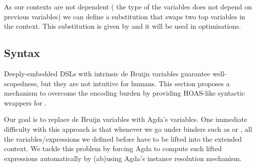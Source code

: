 As our contexts are not dependent (\eg{} the type of the variables does not
depend on previous variables) we can define a substitution that swaps two top
variables in the context.  This substitution is given by  and it
will be used in optimisations.
\begin{mathpar}
\end{mathpar}

\subsection{Syntax}
Deeply-embedded DSLs with intrinsic de Bruijn variables guarantee well-scopedness,
but they are not intuitive for humans.  This section proposes a mechanism
to overcome the encoding burden by providing HOAS-like syntactic wrappers for
.

Our goal is to replace de Bruijn variables with Agda's variables.  One immediate
difficulty with this approach is that whenever we go under binders such as 
 or , all the variables/expressions we defined before have to be
lifted into the extended context.  We tackle this problem by forcing Agda to
compute such lifted expressions automatically by (ab)using Agda's
instance resolution mechanism.

